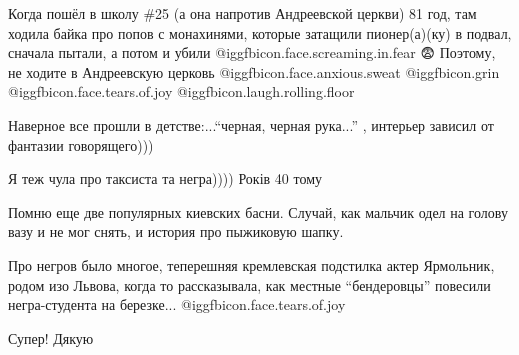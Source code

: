 \begin{itemize}

Когда пошёл в школу \#25 (а она напротив Андреевской церкви) 81 год, там ходила
байка про попов с монахинями, которые затащили пионер(а)(ку) в подвал, сначала
пытали, а потом и убили @igg{fbicon.face.screaming.in.fear} 😨 Поэтому, не ходите в Андреевскую церковь @igg{fbicon.face.anxious.sweat}  @igg{fbicon.grin}  @igg{fbicon.face.tears.of.joy}  @igg{fbicon.laugh.rolling.floor} 


Наверное все прошли в детстве:...\enquote{черная, черная рука...} , интерьер зависил от фантазии говорящего)))

Я теж чула про таксиста та негра)))) Років 40 тому


Помню еще две популярных киевских басни. Случай, как мальчик одел на голову
вазу и не мог снять, и история про пыжиковую шапку.


Про негров было многое, теперешняя кремлевская подстилка актер Ярмольник, родом
изо Львова, когда то рассказывала, как местные \enquote{бендеровцы} повесили
негра-студента на березке... @igg{fbicon.face.tears.of.joy} 

Супер! Дякую

\end{itemize} %
